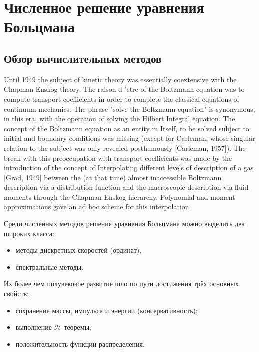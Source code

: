 \chapter{Численное решение уравнения Больцмана} \label{chapt:numerics}

\section{Обзор вычислительных методов} \label{sect:review}

Until 1949 the subject of kinetic theory was essentially
coextensive with the Chapman-Enskog theory. The ralson
d 'etre of the Boltzmann equation was to compute transport coefficients in order to complete the classical equations of continuum mechanics. The phrase "solve the Boltzmann equation" is synonymous, in this era, with the operation of solving the Hilbert Integral equation. The concept of the Boltzmann equation as an entity in Itself, to be solved subject to initial and boundary conditions was missing (except for Carleman, whose singular relation to the subject was only revealed posthumously [Carleman, 1957]).
The break with this preoccupation with transport coefficients was made by the introduction of the concept
of Interpolating different levels of description of a
gas [Grad, 1949] between the (at that time) almost inaccessible Boltzmann description via a distribution function and the macroscopic description via fluid moments through the Chapman-Enskog hierarchy. Polynomial and moment approximations gave an ad hoc scheme for this interpolation.




Среди численных методов решения уравнения Больцмана можно выделить два широких класса:
\begin{itemize}
    \item методы дискретных скоростей (ординат),
    \item спектральные методы.
\end{itemize}


Их более чем полувековое развитие шло по пути достижения трёх основных свойств:
\begin{itemize}
    \item сохранение массы, импульса и энергии (консервативность);
    \item выполнение \(\mathcal{H}\)-теоремы;
    \item положительность функции распределения.
\end{itemize}

